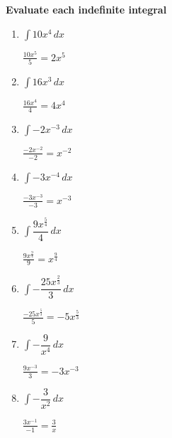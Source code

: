 \documentclass[answers]{exam}
\begin{document}
\begin{questions}

\question \large\textbf{Evaluate each indefinite integral}
    \begin{enumerate}
        \item $\displaystyle \int 10x^4 \, dx$
        \begin{solution}
        $\displaystyle \frac{10x^5}{5}  = 2x^5 $
        \end{solution}
        
        \item $\displaystyle \int 16x^3\, dx$
        \begin{solution}
        $\displaystyle \frac{16x^4}{4}  = 4x^4 $
        \end{solution}

        \item $\displaystyle \int -2x^{-3}\, dx$
        \begin{solution}
        $\displaystyle \frac{-2x^{-2}}{-2}  = x^{-2} $
        \end{solution}

        \item $\displaystyle \int -3x^{-4}\, dx$
        \begin{solution}
        $\displaystyle \frac{-3x^{-3}}{-3}  = x^{-3} $
        \end{solution}

        \item $\displaystyle \int \dfrac{9x^{\frac{5}{4}}}{4}\, dx$
        \begin{solution}
        $\displaystyle \frac{9x^{\frac{9}{4}}}{9}  = x^{\frac{9}{4}} $
        \end{solution}

        \item $\displaystyle \int - \dfrac{25x^{\frac{2}{3}}}{3}\, dx$
        \begin{solution}
        $\displaystyle \frac{-25x^{\frac{5}{3}}}{5}  = -5x^{\frac{5}{3}} $
        \end{solution}

        \item $\displaystyle \int - \dfrac{9}{x^4}\, dx$
        \begin{solution}
        $\displaystyle \frac{9x^{-3}}{3}  = -3x^{-3} $
        \end{solution}

        \item $\displaystyle \int - \dfrac{3}{x^2}\, dx$
        \begin{solution}
        $\displaystyle \frac{3x^{-1}}{-1}  = \frac{3}{x} $
        \end{solution}


\end{enumerate}
\end{questions}
\end{document}
